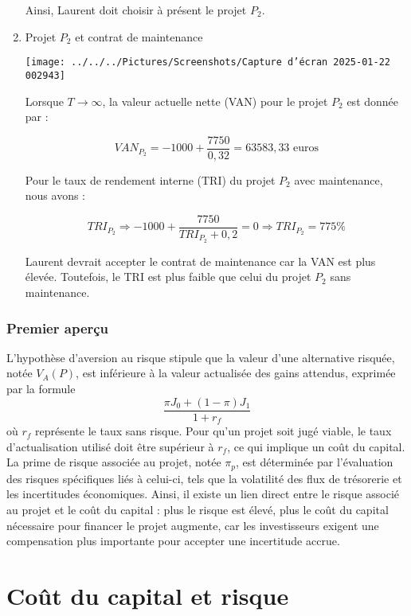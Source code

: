 \documentclass[a4paper, 12pt]{report}
\begin{document}
\begin{enumerate}
Ainsi, Laurent doit choisir à présent le projet \( P_2 \).

\item Projet \( P_2 \) et contrat de maintenance

\begin{center}
	
	\texttt{[image: ../../../Pictures/Screenshots/Capture d'écran 2025-01-22 002943]}

\end{center}

Lorsque \( T \to \infty \), la valeur actuelle nette (VAN) pour le projet \( P_2 \) est donnée par :

\[
VAN_{P_2} = -1000 + \frac{7750}{0,32} = 63583,33 \text{ euros}
\]

Pour le taux de rendement interne (TRI) du projet \( P_2 \) avec maintenance, nous avons :

\[
TRI_{P_2} \Rightarrow -1000 + \frac{7750}{TRI_{P_2} + 0,2} = 0 \Rightarrow TRI_{P_2} = 775\%
\]

Laurent devrait accepter le contrat de maintenance car la VAN est plus élevée. Toutefois, le TRI est plus faible que celui du projet \( P_2 \) sans maintenance.

\end{enumerate}

\subsection{Premier aperçu}

L'hypothèse d'aversion au risque stipule que la valeur d'une alternative risquée, notée \( V_A(P) \), est inférieure à la valeur actualisée des gains attendus, exprimée par la formule \[ \frac{\pi J_0 + (1 - \pi) J_1}{1 + r_f}  \]où \( r_f \) représente le taux sans risque. Pour qu'un projet soit jugé viable, le taux d'actualisation utilisé doit être supérieur à \( r_f \), ce qui implique un coût du capital. La prime de risque associée au projet, notée \( \pi_p \), est déterminée par l'évaluation des risques spécifiques liés à celui-ci, tels que la volatilité des flux de trésorerie et les incertitudes économiques. Ainsi, il existe un lien direct entre le risque associé au projet et le coût du capital : plus le risque est élevé, plus le coût du capital nécessaire pour financer le projet augmente, car les investisseurs exigent une compensation plus importante pour accepter une incertitude accrue.

\chapter{Coût du capital et risque}
\end{document}
